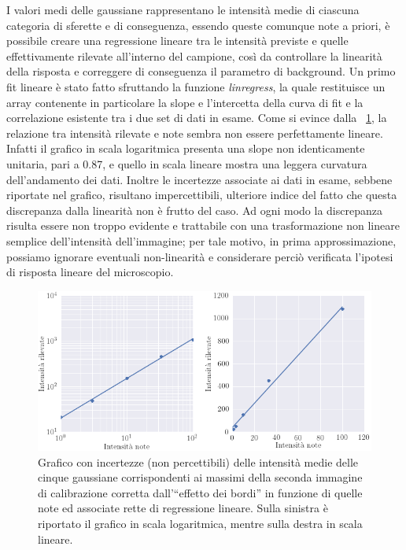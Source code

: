 I valori medi delle gaussiane rappresentano le intensità medie di ciascuna categoria di sferette e di conseguenza, essendo queste comunque note a priori, è possibile creare una regressione lineare tra le intensità previste e quelle effettivamente rilevate all'interno del campione, così da controllare la linearità della risposta e correggere di conseguenza il parametro di background. 
Un primo fit lineare è stato fatto sfruttando la funzione \textit{linregress}, la quale restituisce un array contenente in particolare la slope e l'intercetta della curva di fit e la correlazione esistente tra i due set di dati in esame.
Come si evince dalla \figurename~\ref{fig:linearita}, la relazione tra intensità rilevate e note sembra non essere perfettamente lineare. Infatti il grafico in scala logaritmica presenta una slope non identicamente unitaria, pari a 0.87, e quello in scala lineare mostra una leggera curvatura dell'andamento dei dati. 
Inoltre le incertezze associate ai dati in esame, sebbene riportate nel grafico, risultano impercettibili, ulteriore indice del fatto che questa discrepanza dalla linearità non è frutto del caso.
Ad ogni modo la discrepanza risulta essere non troppo evidente e trattabile con una trasformazione non lineare semplice dell'intensità dell'immagine; per tale motivo, in prima approssimazione, possiamo ignorare eventuali non-linearità e considerare perciò verificata l'ipotesi di risposta lineare del microscopio. 

\begin{figure}
 \centering
 \includegraphics[scale=.55]{img/CAP3linearita.png}
 \caption{\small{Grafico con incertezze (non percettibili) delle intensità medie delle cinque gaussiane corrispondenti ai massimi della seconda immagine di calibrazione corretta dall'``effetto dei bordi'' in funzione di quelle note ed associate rette di regressione lineare. Sulla sinistra è riportato il grafico in scala logaritmica, mentre sulla destra in scala lineare.}}
 \label{fig:linearita}
\end{figure}


